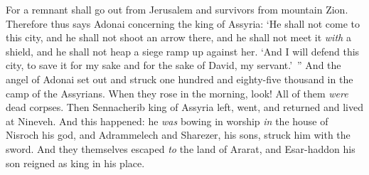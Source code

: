 \begin{biblechapter}
\verse For a remnant shall go out from Jerusalem 
and survivors from mountain Zion.
\verse Therefore thus says Adonai concerning the king of Assyria:
\verse ‘He shall not come to this city, 
and he shall not shoot an arrow there, 
and he shall not meet it \textit{with} a shield, 
and he shall not heap a siege ramp up against her.
\verse ‘And I will defend this city, to save it for my sake and for the sake of David, my servant.’ ”
 And the angel of Adonai set out and struck one hundred and eighty-five thousand in the camp of the Assyrians. When they rose in the morning, look! All of them \textit{were} dead corpses.
\verse Then Sennacherib king of Assyria left, went, and returned and lived at Nineveh.
\verse And this happened: he \textit{was} bowing in worship \textit{in} the house of Nisroch his god, and Adrammelech and Sharezer, his sons, struck him with the sword. And they themselves escaped \textit{to} the land of Ararat, and Esar-haddon his son reigned as king in his place.
\end{biblechapter}

